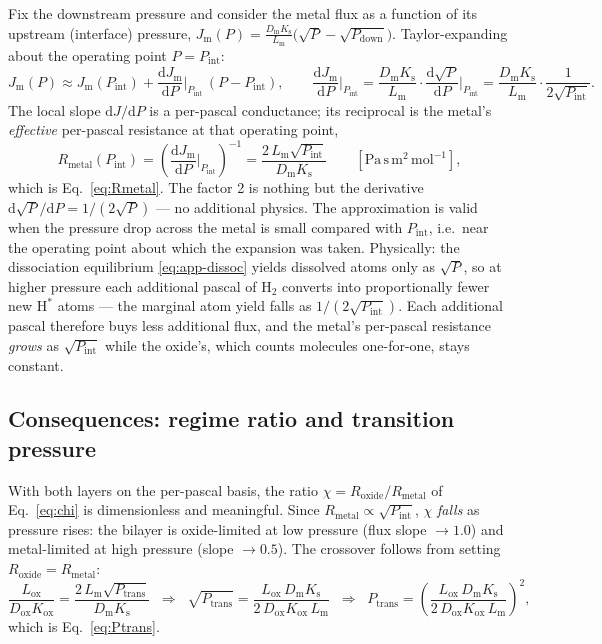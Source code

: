 \documentclass[11pt,a4paper]{article}
\newcommand{\Pdown}{P_{\mathrm{down}}}
\newcommand{\Pint}{P_{\mathrm{int}}}
\newcommand{\Ks}{K_{\mathrm{s}}}
\newcommand{\Kox}{K_{\mathrm{ox}}}
\newcommand{\Dm}{D_{\mathrm{m}}}
\newcommand{\Dox}{D_{\mathrm{ox}}}
\newcommand{\Lm}{L_{\mathrm{m}}}
\newcommand{\Lox}{L_{\mathrm{ox}}}
\newcommand{\Rox}{R_{\mathrm{oxide}}}
\newcommand{\Rmet}{R_{\mathrm{metal}}}
\begin{document}
Fix the downstream pressure and consider the metal flux as a function of its
upstream (interface) pressure, $J_{\mathrm{m}}(P) =
\tfrac{\Dm\Ks}{\Lm}\bigl(\sqrt{P} - \sqrt{\Pdown}\bigr)$. Taylor-expanding
about the operating point $P = \Pint$:
\begin{equation}
  J_{\mathrm{m}}(P) \approx J_{\mathrm{m}}(\Pint)
  + \frac{\mathrm{d}J_{\mathrm{m}}}{\mathrm{d}P}\bigg|_{\Pint}\,(P - \Pint),
  \qquad
  \frac{\mathrm{d}J_{\mathrm{m}}}{\mathrm{d}P}\bigg|_{\Pint}
  = \frac{\Dm\Ks}{\Lm}\cdot
    \frac{\mathrm{d}\sqrt{P}}{\mathrm{d}P}\bigg|_{\Pint}
  = \frac{\Dm\Ks}{\Lm}\cdot\frac{1}{2\sqrt{\Pint}}.
  \label{eq:app-taylor}
\end{equation}
The local slope $\mathrm{d}J/\mathrm{d}P$ is a per-pascal conductance; its
reciprocal is the metal's \emph{effective} per-pascal resistance at that
operating point,
\begin{equation}
  \Rmet(\Pint)
  = \left(\frac{\mathrm{d}J_{\mathrm{m}}}{\mathrm{d}P}\bigg|_{\Pint}\right)^{-1}
  = \frac{2\,\Lm\sqrt{\Pint}}{\Dm\Ks}
  \qquad [\mathrm{Pa\,s\,m^{2}\,mol^{-1}}],
  \label{eq:app-Rmet}
\end{equation}
which is Eq.~\eqref{eq:Rmetal}. The factor 2 is nothing but the derivative
$\mathrm{d}\sqrt{P}/\mathrm{d}P = 1/(2\sqrt{P})$ --- no additional physics.
The approximation is valid when the pressure drop across the metal is small
compared with $\Pint$, i.e.\ near the operating point about which the
expansion was taken. Physically: the dissociation equilibrium
\eqref{eq:app-dissoc} yields dissolved atoms only as $\sqrt{P}$, so at higher
pressure each additional pascal of $\mathrm{H_2}$ converts into
proportionally fewer new $\mathrm{H}^{*}$ atoms --- the marginal atom yield
falls as $1/(2\sqrt{\Pint})$. Each additional pascal therefore buys less
additional flux, and the metal's per-pascal resistance \emph{grows} as
$\sqrt{\Pint}$ while the oxide's, which counts molecules one-for-one, stays
constant.

\subsection{Consequences: regime ratio and transition pressure}

With both layers on the per-pascal basis, the ratio
$\chi = \Rox/\Rmet$ of Eq.~\eqref{eq:chi} is dimensionless and meaningful.
Since $\Rmet \propto \sqrt{\Pint}$, $\chi$ \emph{falls} as pressure rises:
the bilayer is oxide-limited at low pressure (flux slope $\to 1.0$) and
metal-limited at high pressure (slope $\to 0.5$). The crossover follows from
setting $\Rox = \Rmet$:
\begin{equation}
  \frac{\Lox}{\Dox\Kox} = \frac{2\,\Lm\sqrt{P_{\mathrm{trans}}}}{\Dm\Ks}
  \;\;\Longrightarrow\;\;
  \sqrt{P_{\mathrm{trans}}} = \frac{\Lox\,\Dm\Ks}{2\,\Dox\Kox\,\Lm}
  \;\;\Longrightarrow\;\;
  P_{\mathrm{trans}} = \left(\frac{\Lox\,\Dm\Ks}{2\,\Dox\Kox\,\Lm}\right)^{2},
  \label{eq:app-Ptrans}
\end{equation}
which is Eq.~\eqref{eq:Ptrans}.
\end{document}
